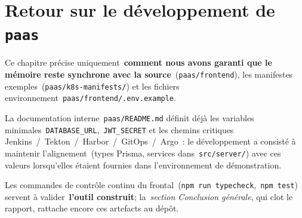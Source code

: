 
\chapter{Retour sur le développement de \texttt{paas}}
\label{ch:retex}

Ce chapitre précise uniquement~\textbf{comment nous avons garanti que le mémoire reste synchrone avec la source}~(\texttt{paas/frontend}), les manifestes exemples~(\texttt{paas/k8s-manifests/}) et les fichiers environnement~\texttt{paas/frontend/.env.example}.

La documentation interne~\texttt{paas/README.md} définit déjà les variables minimales~\texttt{DATABASE\_URL},~\texttt{JWT\_SECRET} et les chemins critiques Jenkins~/~Tekton~/~Harbor~/~GitOps~/~Argo~: le développement a consisté à maintenir l'alignement~(types Prisma, services dans~\texttt{src/server/}) avec ces valeurs lorsqu'elles étaient fournies dans l'environnement de démonstration.

Les commandes de contrôle continu du frontal~(\texttt{npm run typecheck},~\texttt{npm test}) servent à valider~\textbf{l'outil construit}; la~\emph{section Conclusion générale}, qui clot le rapport, rattache encore ces artefacts au dépôt.
